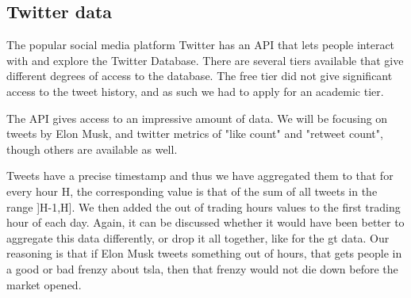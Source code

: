 \subsection{Twitter data}
The popular social media platform Twitter has an \Gls{API} that lets people interact with and explore the Twitter Database. There are several tiers available that give different degrees of access to the database. The free tier did not give significant access to the tweet history, and as such we had to apply for an academic tier.

The API gives access to an impressive amount of data. We will be focusing on tweets by Elon Musk, and twitter metrics of "like count" and "retweet count", though others are available as well.

Tweets have a precise timestamp and thus we have aggregated them to that for every hour H, the corresponding value is that of the sum of all tweets in the range ]H-1,H]. We then added the out of trading hours values to the first trading hour of each day. Again, it can be discussed whether it would have been better to aggregate this data differently, or drop it all together, like for the \acrlong{gt} data. Our reasoning is that if Elon Musk tweets something out of hours, that gets people in a good or bad frenzy about \acrshort{tsla}, then that frenzy would not die down before the market opened.